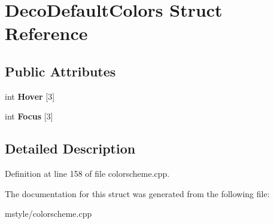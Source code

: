 \hypertarget{struct_deco_default_colors}{}\section{Deco\+Default\+Colors Struct Reference}
\label{struct_deco_default_colors}
\subsection*{Public Attributes}
\begin{DoxyCompactItemize}
\item 
\mbox{\label{struct_deco_default_colors_a7a2f6ec0f1bcb9e8dcc647fd4acaf503}} 
int {\bfseries Hover} \mbox{[}3\mbox{]}
\item 
\mbox{\label{struct_deco_default_colors_a6f5dd1df560dd39c32a69d408cc3ce8f}} 
int {\bfseries Focus} \mbox{[}3\mbox{]}
\end{DoxyCompactItemize}


\subsection{Detailed Description}


Definition at line 158 of file colorscheme.\+cpp.



The documentation for this struct was generated from the following file\+:\begin{DoxyCompactItemize}
\item 
mstyle/colorscheme.\+cpp\end{DoxyCompactItemize}

